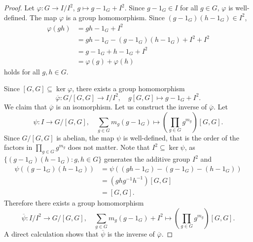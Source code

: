 \begin{proof}
    Let $\varphi\colon G\to I/I^2$, $g\mapsto g-1_G+I^2$. Since $g-1_G\in I$ for all $g\in G$, $\varphi$ is well-defined. The map $\varphi$ is a group homomorphism. Since 
    $(g-1_G)(h-1_G)\in I^2$, 
    \begin{align*}
    \varphi(gh) &= gh-1_G+I^2\\
    &=gh-1_G-(g-1_G)(h-1_G)+I^2+I^2\\
    &=g-1_G+h-1_G+I^2\\
    &=\varphi(g)+\varphi(h)
    \end{align*}
    holds for all $g,h\in G$. 

    Since $[G,G]\subseteq\ker\varphi$, there exists a group homomorphism
    \[
    \overline{\varphi}\colon G/[G,G]\to I/I^2,\quad 
    g[G,G]\mapsto g-1_G+I^2.
    \]
    We claim that $\overline{\varphi}$ is an isomorphism. 
    Let us construct the inverse of $\overline{\varphi}$. Let 
    \[
    \psi\colon I\to G/[G,G],\quad 
    \sum_{g\in G}m_g(g-1_G)\mapsto \left(\prod_{g\in G}g^{m_g}\right)[G,G].
    \]
    Since $G/[G,G]$ is abelian, the map $\psi$ is well-defined, that is
    the order of the factors in $\prod_{g\in G}g^{m_g}$ does not matter. Note that 
    $I^2\subseteq\ker\psi$, as 
    $\{(g-1_G)(h-1_G):g,h\in G\}$ generates the additive group $I^2$ 
    and 
    \begin{align*}
        \psi((g-1_G)(h-1_G))&=\psi( (gh-1_G)-(g-1_G)-(h-1_G))\\
        &=(ghg^{-1}h^{-1})[G,G]\\
        &=[G,G].
    \end{align*}
    Therefore there exists a group homomorphism
    \[
    \overline{\psi}\colon I/I^2\to G/[G,G],\quad 
    \sum_{g\in G}m_g(g-1_G)+I^2\mapsto \left(\prod_{g\in G}g^{m_g}\right)[G,G].
    \]
    A direct calculation shows that $\overline{\psi}$ is the inverse 
    of $\overline{\varphi}$. 
\end{proof}

